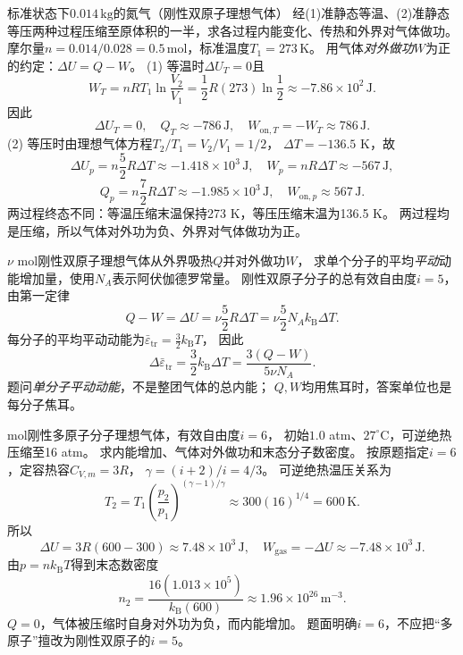 

\problemtext 标准状态下$0.014\,\mathrm{kg}$的氮气（刚性双原子理想气体）
经(1)准静态等温、(2)准静态等压两种过程压缩至原体积的一半，求各过程内能变化、传热和外界对气体做功。
\workings
摩尔量$n=0.014/0.028=0.5\,\mathrm{mol}$，标准温度$T_1=273\,\mathrm K$。
用气体\emph{对外做功}$W$为正的约定：$\Delta U=Q-W$。
(1) 等温时$\Delta U_T=0$且
\[
W_T=nRT_1\ln\frac{V_2}{V_1}
=\frac12 R(273)\ln\frac12\approx-7.86\times10^2\,\mathrm J.
\]
因此
\[
\boxed{\Delta U_T=0},\quad
\boxed{Q_T\approx-786\,\mathrm J},\quad
\boxed{W_{\mathrm{on},T}=-W_T\approx786\,\mathrm J}.
\]
(2) 等压时由理想气体方程$T_2/T_1=V_2/V_1=1/2$，
$\Delta T=-136.5$ K，故
\[
\boxed{\Delta U_p=n\frac52 R\Delta T\approx-1.418\times10^3\,\mathrm J},
\quad
\boxed{W_p=nR\Delta T\approx-567\,\mathrm J},
\]
\[
\boxed{Q_p=n\frac72 R\Delta T\approx-1.985\times10^3\,\mathrm J},
\quad
\boxed{W_{\mathrm{on},p}\approx567\,\mathrm J}.
\]
\crosscheck 两过程终态不同：等温压缩末温保持273 K，等压压缩末温为136.5 K。
两过程均是压缩，所以气体对外功为负、外界对气体做功为正。

\problemtext $\nu$ mol刚性双原子理想气体从外界吸热$Q$并对外做功$W$，
求单个分子的平均\emph{平动}动能增加量，使用$N_A$表示阿伏伽德罗常量。
\workings
刚性双原子分子的总有效自由度$i=5$，由第一定律
\[
Q-W=\Delta U=\nu\frac52 R\Delta T
=\nu\frac52N_Ak_{\mathrm B}\Delta T.
\]
每分子的平均平动动能为$\bar\varepsilon_{\mathrm{tr}}=\frac32k_{\mathrm B}T$，
因此
\[
\boxed{\Delta\bar\varepsilon_{\mathrm{tr}}
=\frac32k_{\mathrm B}\Delta T
=\frac{3(Q-W)}{5\nu N_A}}.
\]
\crosscheck 题问\emph{单分子平动动能}，不是整团气体的总内能；
$Q,W$均用焦耳时，答案单位也是每分子焦耳。

 mol刚性多原子分子理想气体，有效自由度$i=6$，
初始$1.0$ atm、$27^\circ$C，可逆绝热压缩至16 atm。
求内能增加、气体对外做功和末态分子数密度。
\workings
按原题指定$i=6$，定容热容$C_{V,m}=3R$，
$\gamma=(i+2)/i=4/3$。
可逆绝热温压关系为
\[
T_2=T_1\left(\frac{p_2}{p_1}\right)^{(\gamma-1)/\gamma}
\approx 300(16)^{1/4}=600\,\mathrm K.
\]
所以
\[
\boxed{\Delta U=3R(600-300)\approx7.48\times10^3\,\mathrm J},
\quad
\boxed{W_{\mathrm{gas}}=-\Delta U\approx-7.48\times10^3\,\mathrm J}.
\]
由$p=nk_{\mathrm B}T$得到末态数密度
\[
\boxed{n_2=\frac{16(1.013\times10^5)}{k_{\mathrm B}(600)}
\approx1.96\times10^{26}\,\mathrm{m^{-3}}}.
\]
\crosscheck $Q=0$，气体被压缩时自身对外功为负，而内能增加。
题面明确$i=6$，不应把“多原子”擅改为刚性双原子的$i=5$。

